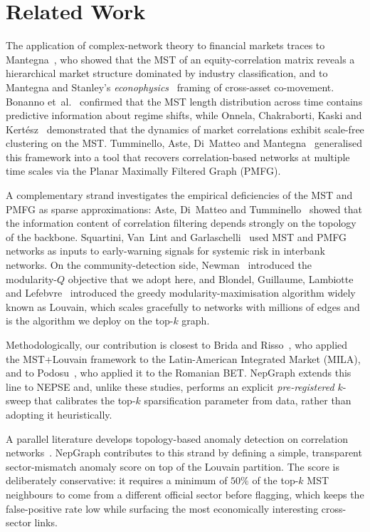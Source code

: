 \section{Related Work}
\label{sec:related}

The application of complex-network theory to financial markets traces to
Mantegna~\cite{mantegna1999hierarchical}, who showed that the MST of an
equity-correlation matrix reveals a hierarchical market structure
dominated by industry classification, and to Mantegna and Stanley's
\emph{econophysics}~\cite{mantegna1999introduction} framing of
cross-asset co-movement.  Bonanno et~al.~\cite{bonanno2001topology}
confirmed that the MST length distribution across time contains
predictive information about regime shifts, while Onnela, Chakraborti,
Kaski and Kert\'esz~\cite{onnela2003dynamics} demonstrated that the
dynamics of market correlations exhibit scale-free clustering on the MST.
Tumminello, Aste, Di~Matteo and
Mantegna~\cite{tumminello2005tool} generalised this framework into a tool
that recovers correlation-based networks at multiple time scales via the
Planar Maximally Filtered Graph (PMFG).

A complementary strand investigates the empirical deficiencies of the
MST and PMFG as sparse approximations: Aste, Di~Matteo and
Tumminello~\cite{aste2010correlation} showed that the information content
of correlation filtering depends strongly on the topology of the backbone.
Squartini, Van~\hbox{Lint} and
Garlaschelli~\cite{squartini2018early} used MST and PMFG networks as
inputs to early-warning signals for systemic risk in interbank networks.
On the community-detection side,
Newman~\cite{newman2003structure,newman2006modularity} introduced the
modularity-$Q$ objective that we adopt here, and Blondel, Guillaume,
Lambiotte and Lefebvre~\cite{blondel2008fast} introduced the greedy
modularity-maximisation algorithm widely known as Louvain, which scales
gracefully to networks with millions of edges and is the algorithm we
deploy on the top-$k$ graph.

Methodologically, our contribution is closest to Brida and
Risso~\cite{brida2010dynamical}, who applied the MST+Louvain framework
to the Latin-American Integrated Market (MILA), and to
Podosu~\cite{podosu2013network}, who applied it to the Romanian BET.
NepGraph extends this line to NEPSE and, unlike these studies, performs
an explicit \emph{pre-registered} $k$-sweep that calibrates the top-$k$
sparsification parameter from data, rather than adopting it heuristically.

A parallel literature develops topology-based anomaly detection on
correlation networks~\cite{fiedor2014information, bardoscia2015guide,
lillo2002econophysics}.  NepGraph contributes to this strand by defining
a simple, transparent sector-mismatch anomaly score on top of the
Louvain partition.  The score is deliberately conservative: it requires
a minimum of $50\%$ of the top-$k$ MST neighbours to come from a
different official sector before flagging, which keeps the
false-positive rate low while surfacing the most economically
interesting cross-sector links.

\newpage
